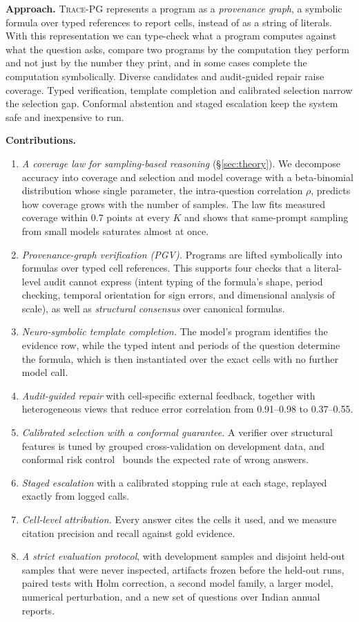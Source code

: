 \documentclass[conference]{IEEEtran}
\newcommand{\ours}{\textsc{Trace-PG}}
\begin{document}
\textbf{Approach.} \ours{} represents a program as a \emph{provenance graph}, a symbolic formula over typed references to report cells, instead of as a string of literals. With this representation we can type-check what a program computes against what the question asks, compare two programs by the computation they perform and not just by the number they print, and in some cases complete the computation symbolically. Diverse candidates and audit-guided repair raise coverage. Typed verification, template completion and calibrated selection narrow the selection gap. Conformal abstention and staged escalation keep the system safe and inexpensive to run.

\textbf{Contributions.}
\begin{enumerate}
\item \emph{A coverage law for sampling-based reasoning} (\S\ref{sec:theory}). We decompose accuracy into coverage and selection and model coverage with a beta-binomial distribution whose single parameter, the intra-question correlation $\rho$, predicts how coverage grows with the number of samples. The law fits measured coverage within 0.7 points at every $K$ and shows that same-prompt sampling from small models saturates almost at once.
\item \emph{Provenance-graph verification (PGV).} Programs are lifted symbolically into formulas over typed cell references. This supports four checks that a literal-level audit cannot express (intent typing of the formula's shape, period checking, temporal orientation for sign errors, and dimensional analysis of scale), as well as \emph{structural consensus} over canonical formulas.
\item \emph{Neuro-symbolic template completion.} The model's program identifies the evidence row, while the typed intent and periods of the question determine the formula, which is then instantiated over the exact cells with no further model call.
\item \emph{Audit-guided repair} with cell-specific external feedback, together with heterogeneous views that reduce error correlation from 0.91--0.98 to 0.37--0.55.
\item \emph{Calibrated selection with a conformal guarantee.} A verifier over structural features is tuned by grouped cross-validation on development data, and conformal risk control~\cite{crc} bounds the expected rate of wrong answers.
\item \emph{Staged escalation} with a calibrated stopping rule at each stage, replayed exactly from logged calls.
\item \emph{Cell-level attribution.} Every answer cites the cells it used, and we measure citation precision and recall against gold evidence.
\item \emph{A strict evaluation protocol}, with development samples and disjoint held-out samples that were never inspected, artifacts frozen before the held-out runs, paired tests with Holm correction, a second model family, a larger model, numerical perturbation, and a new set of questions over Indian annual reports.
\end{enumerate}
\end{document}
